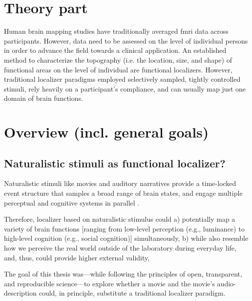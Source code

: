 \section{Theory part}


Human brain mapping studies have traditionally averaged \ac{fmri} data across
participants.
%
However, data need to be assessed on the level of individual persons in order to
advance the field towards a clinical application.
An established method to characterize the topography (i.e. the location, size,
and shape) of functional areas on the level of individual are functional
localizers.
However, traditional localizer paradigms employed selectively sampled, tightly
controlled stimuli, rely heavily on a participant's compliance, and can usually
map just one domain of brain functions.


\section{Overview (incl. general goals)}


\subsection{Naturalistic stimuli as functional localizer?}

Naturalistic stimuli like movies and auditory narratives \citep[cf.][for
reviews]{jaaskelainen2021movies, jaaskelainen2020neural} provide a time-locked
event structure that samples a broad range of brain states, and engage multiple
perceptual and cognitive systems in parallel \citep{haxby2020naturalistic}.

%
Therefore, localizer based on naturalistic stimulus could
%
a) potentially map a variety of brain functions [ranging from low-level
perception (e.g., luminance) to high-level cognition (e.g., social cognition)]
simultaneously,
%
b) while also resemble how we perceive the real world outside of the laboratory
during everyday life, and, thus, could provide higher external validity,


%
The goal of this thesis was---while following the principles of
open, transparent, and reproducible science---to explore whether a movie
and the movie's audio-description could, in principle, substitute a traditional
localizer paradigm.

